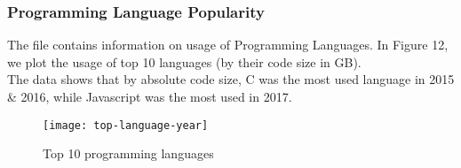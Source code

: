 \subsubsection{Programming Language Popularity}

The  file contains information on usage of Programming Languages.
In Figure 12, we plot the usage of top 10 languages (by their code size in GB). \\

The data shows that by absolute code size, C was the most used language in 2015 \& 2016, while
Javascript was the most used in 2017.

\vspace{25px}
\begin{figure}[htb]
\centering
\texttt{[image: top-language-year]}
\caption{Top 10 programming languages}
\end{figure}
